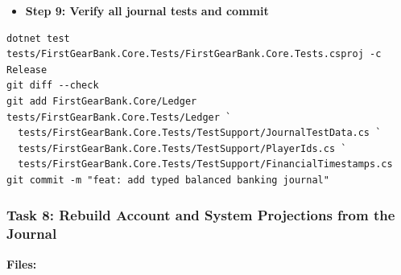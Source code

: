 \documentclass[
  10pt,
  letterpaper,
]{article}
\providecommand{\tightlist}{%
  \setlength{\itemsep}{0pt}\setlength{\parskip}{0pt}}
\begin{document}
\begin{itemize}
\tightlist
\item[$\square$]
  \textbf{Step 9: Verify all journal tests and commit}
\end{itemize}

\begin{lstlisting}
dotnet test tests/FirstGearBank.Core.Tests/FirstGearBank.Core.Tests.csproj -c Release
git diff --check
git add FirstGearBank.Core/Ledger tests/FirstGearBank.Core.Tests/Ledger `
  tests/FirstGearBank.Core.Tests/TestSupport/JournalTestData.cs `
  tests/FirstGearBank.Core.Tests/TestSupport/PlayerIds.cs `
  tests/FirstGearBank.Core.Tests/TestSupport/FinancialTimestamps.cs
git commit -m "feat: add typed balanced banking journal"
\end{lstlisting}

\subsubsection{Task 8: Rebuild Account and System Projections from the
Journal}\label{task-8-rebuild-account-and-system-projections-from-the-journal}

\textbf{Files:}
\end{document}
